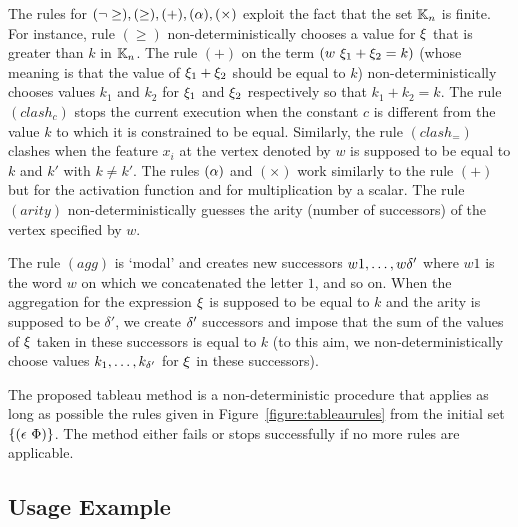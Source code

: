 The rules for $(\lnot\geq), (\geq), (+), (\alpha), (\times)$ exploit the fact that the set $\mathbb K_n$ is finite. For instance, rule $(\geq)$ non-deterministically chooses a value for $\xi$ that is greater than $k$ in $\mathbb K_n$.
The rule $(+)$ on the term $(w~\xi_1+\xi_2=k)$ (whose meaning is that the value of $\xi_1+\xi_2$ should be equal to $k$) non-deterministically chooses values $k_1$ and $k_2$ for $\xi_1$ and $\xi_2$ respectively so that $k_1 + k_2 = k$.
The rule $(clash_c)$ stops the current execution when the constant $c$ is different from the value $k$ to which it is constrained to be equal. Similarly, the rule $(clash_=)$ clashes when the feature $x_i$ at the vertex denoted by $w$ is supposed to be equal to $k$ and $k'$ with $k\neq k'$. The rules $(\alpha)$ and $(\times)$ work similarly to the rule $(+)$ but for the activation function and for multiplication by a scalar. 
The rule $(arity)$ non-deterministically guesses the arity (number of successors) of the vertex specified by $w$.

The rule $(agg)$ is `modal' and creates new successors $w1, \dots, w\delta'$ where $w1$ is the word $w$ on which we concatenated the letter $1$, and so on. When the aggregation for the expression $\xi$ is supposed to be equal to $k$ and the arity is supposed to be $\delta'$, we create $\delta'$ successors and impose that the sum of the values of $\xi$ taken in these successors is equal to $k$ (to this aim, we non-deterministically choose values $k_1, \dots, k_{\delta'}$ for $\xi$ in these successors).

 The proposed tableau method is a non-deterministic procedure that applies as long as possible the rules given in Figure~\ref{figure:tableaurules} from the initial set ${\{(\epsilon~\Phi)\}}$.%
 The method either fails or stops successfully if no more rules are applicable.

\subsection{Usage Example}










%
    
